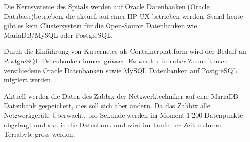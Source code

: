 

Die Kernsysteme des Spitals werden auf Oracle Datenbanken (\Gls{Oracle Database})betrieben, die aktuell auf einer \Gls{HP-UX} betrieben werden.
Stand heute gibt es kein Clustersystem für die Open-Source Datenbanken wie \Gls{MariaDB}/\Gls{MySQL} oder \Gls{PostgreSQL}\@.

Durch die Einführung von \Gls{Kubernetes} als Containerplattform wird der Bedarf an \Gls{PostgreSQL} Datenbanken immer grösser.
Es werden in naher Zukunft auch verschiedene Oracle Datenbanken sowie \Gls{MySQL} Datenbanken auf \Gls{PostgreSQL} migriert werden.

Aktuell werden die Daten des \Gls{Zabbix} der Netzwerktechniker auf eine \Gls{MariaDB} Datenbank gespeichert, dies soll sich aber ändern.
Da das \Gls{Zabbix} alle Netzwerkgeräte Überwacht, pro Sekunde werden im Moment 1'200 Datenpunkte abgefragt und xxx in die Datenbank und wird im Laufe der Zeit mehrere Terrabyte gross werden.
